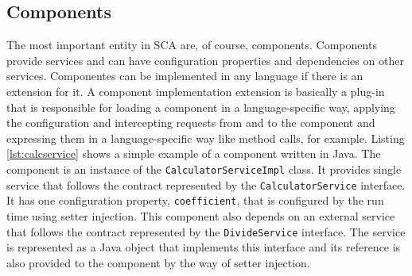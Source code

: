 \subsection{Components}

The most important entity in SCA are, of course, components. Components provide services and can have configuration properties
and dependencies on other services. Componentes can be implemented in any language if there is an extension for it. A component
implementation extension is basically a plug-in that is responsible for loading a component in a language-specific way, applying
the configuration and intercepting requests from and to the component and expressing them in a language-specific way like method
calls, for example. Listing \ref{lst:calcservice} shows a simple example of a component written in Java. The component is an instance
of the \texttt{CalculatorServiceImpl} class. It provides single service that follows the contract represented by the \texttt{CalculatorService}
interface. It has one configuration property, \texttt{coefficient}, that is configured by the run time using setter injection.
This component also depends on an external service that follows the contract represented by the \texttt{DivideService} interface.
The service is represented as a Java object that implements this interface and its reference is also provided to the component
by the way of setter injection.

